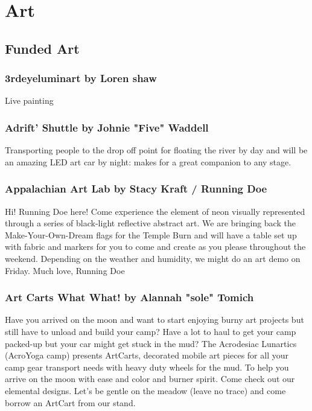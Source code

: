 %
%

\chapter{Art}


\begin{multicols}{2}


\section*{Funded Art}

\subsection*{3rdeyeluminart by Loren shaw}
        Live painting

\subsection*{Adrift' Shuttle by Johnie "Five" Waddell}
         Transporting people to the drop off point for floating the river by day and will be         an amazing LED art car by night: makes for a great companion to any stage.        


\subsection*{Appalachian Art Lab by Stacy Kraft / Running Doe                       }
Hi! Running Doe here! Come experience the element of neon visually represented through a series of black-light reflective abstract art. We are bringing back the Make-Your-Own-Dream flags for the Temple Burn and will have a table set up with fabric and markers for you to come and create as you please throughout the weekend. Depending on the weather and humidity, we might do an art demo on Friday. Much love, Running Doe


\subsection*{Art Carts What What! by Alannah "sole" Tomich        }
Have you arrived on the moon and want to start enjoying burny art projects but still have to unload and build your camp? Have a lot to haul to get your camp packed-up but your car might get stuck in the mud? The Acrodesiac Lunartics (AcroYoga camp) presents ArtCarts, decorated mobile art pieces for all your camp gear transport needs with heavy duty wheels for the mud. To help you arrive on the moon with ease and color and burner spirit. Come check out our elemental designs. Let’s be gentle on the meadow (leave no trace) and come borrow an ArtCart from our stand. 



\end{multicols}
